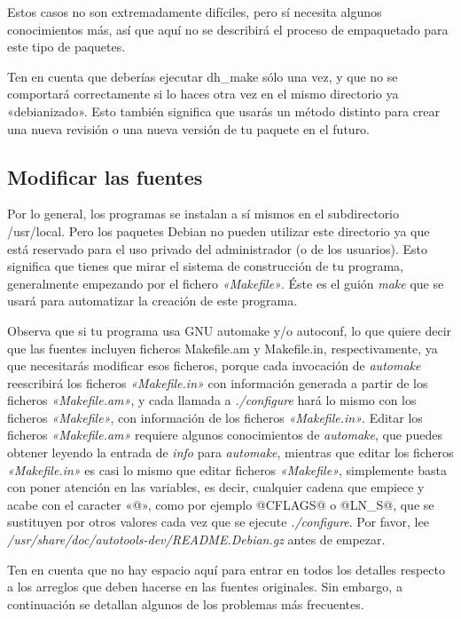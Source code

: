 \documentclass[letterpaper,12pt,spanish]{manual}
\begin{document}
Estos casos no son extremadamente difíciles, pero sí necesita algunos conocimientos más, así que aquí no se describirá el proceso de empaquetado para este tipo de paquetes.

Ten en cuenta que deberías ejecutar dh\_make sólo una vez, y que no se comportará correctamente si lo haces otra vez en el mismo directorio ya «debianizado». Esto también significa que usarás un método distinto para crear una nueva revisión o una nueva versión de tu paquete en el futuro.


\subsection{Modificar las fuentes}

Por lo general, los programas se instalan a sí mismos en el subdirectorio /usr/local. Pero los paquetes Debian no pueden utilizar este directorio ya que está reservado para el uso privado del administrador (o de los usuarios). Esto significa que tienes que mirar el sistema de construcción de tu programa, generalmente empezando por el fichero \emph{«Makefile»}. Éste es el guión \emph{make} que se usará para automatizar la creación de este programa.

Observa que si tu programa usa GNU automake y/o autoconf, lo que quiere decir que las fuentes incluyen ficheros Makefile.am y Makefile.in, respectivamente, ya que necesitarás modificar esos ficheros, porque cada invocación de \emph{automake} reescribirá los ficheros \emph{«Makefile.in»} con información generada a partir de los ficheros \emph{«Makefile.am»}, y cada llamada a \emph{./configure} hará lo mismo con los ficheros \emph{«Makefile»}, con información de los ficheros \emph{«Makefile.in»}. Editar los ficheros \emph{«Makefile.am»} requiere algunos conocimientos de \emph{automake}, que puedes obtener leyendo la entrada de \emph{info} para \emph{automake}, mientras que editar los ficheros \emph{«Makefile.in»} es casi lo mismo que editar ficheros \emph{«Makefile»}, simplemente basta con poner atención en las variables, es decir, cualquier cadena que empiece y acabe con el caracter «@», como por ejemplo @CFLAGS@ o @LN\_S@, que se sustituyen por otros valores cada vez que se ejecute \emph{./configure}. Por favor, lee \emph{/usr/share/doc/autotools-dev/README.Debian.gz} antes de empezar.

Ten en cuenta que no hay espacio aquí para entrar en todos los detalles respecto a los arreglos que deben hacerse en las fuentes originales. Sin embargo, a continuación se detallan algunos de los problemas más frecuentes.
\end{document}
